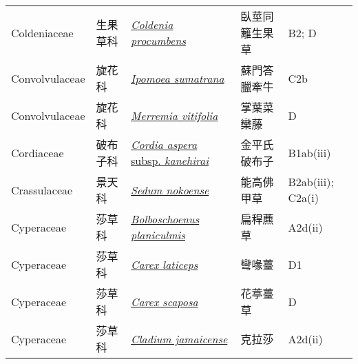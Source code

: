 {\begin{longtable}{L{2.5cm}L{2cm}L{5cm}L{2.5cm}L{3cm}}
    Coldeniaceae & 生果草科 & \href{http://www.theplantlist.org/tpl1.1/search?q=Coldenia+procumbens}{\textit{Coldenia procumbens} } & 臥莖同籬生果草 & B2; D    \\
    Convolvulaceae & 旋花科 & \href{http://www.theplantlist.org/tpl1.1/search?q=Ipomoea+sumatrana}{\textit{Ipomoea sumatrana} } & 蘇門答臘牽牛 & C2b    \\
    Convolvulaceae & 旋花科 & \href{http://www.theplantlist.org/tpl1.1/search?q=Merremia+vitifolia}{\textit{Merremia vitifolia} } & 掌葉菜欒藤 & D    \\
    Cordiaceae & 破布子科 & \href{http://www.theplantlist.org/tpl1.1/search?q=Cordia+aspera+subsp.+kanehirai}{\textit{Cordia aspera} subsp. \textit{kanehirai} } & 金平氏破布子 & B1ab(iii)    \\
    Crassulaceae & 景天科 & \href{http://www.theplantlist.org/tpl1.1/search?q=Sedum+nokoense}{\textit{Sedum nokoense} } & 能高佛甲草 & B2ab(iii); C2a(i)    \\
    Cyperaceae & 莎草科 & \href{http://www.theplantlist.org/tpl1.1/search?q=Bolboschoenus+planiculmis}{\textit{Bolboschoenus planiculmis} } & 扁稈藨草 & A2d(ii)    \\
    Cyperaceae & 莎草科 & \href{http://www.theplantlist.org/tpl1.1/search?q=Carex+laticeps}{\textit{Carex laticeps} } & 彎喙薹 & D1    \\
    Cyperaceae & 莎草科 & \href{http://www.theplantlist.org/tpl1.1/search?q=Carex+scaposa}{\textit{Carex scaposa} } & 花葶薹草 & D    \\
    Cyperaceae & 莎草科 & \href{http://www.theplantlist.org/tpl1.1/search?q=Cladium+jamaicense}{\textit{Cladium jamaicense} } & 克拉莎 & A2d(ii)    \\

\end{longtable}}
